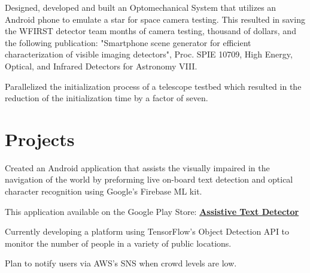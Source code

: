 \documentclass[letterpaper]{deedy-resume} %
\begin{document}
\begin{minipage}[t]{0.66\textwidth}
\sectionspace %


\begin{tightitemize}
	\item 	Designed, developed and built an Optomechanical System that utilizes an Android phone to emulate a star for space camera testing. This resulted in saving the WFIRST detector team months of camera testing, thousand of dollars, and the following publication: "Smartphone scene generator for efficient characterization of visible imaging detectors", Proc. SPIE 10709, High Energy, Optical, and Infrared Detectors for Astronomy VIII.
	
	\item Parallelized the initialization process of a telescope testbed which resulted in the reduction of the initialization time by a factor of seven.   
	
\end{tightitemize}
\sectionspace %


\section{Projects}

\begin{tightitemize}
	\item Created an Android application that assists the visually impaired in the navigation of the world by preforming live on-board text detection and optical character recognition using Google's Firebase ML kit. 
	\item This application available on the Google Play Store:  \href{https://play.google.com/store/apps/details?id=com.leo.neat.assistivetextdetection&pageId=none}{\bf Assistive Text Detector} 
\end{tightitemize}

\sectionspace %
\begin{tightitemize}
	\item Currently developing a  platform using TensorFlow's Object Detection API to monitor the number of people in a variety of public locations. 
	\item Plan to notify users via AWS's SNS when crowd levels are low. 
\end{tightitemize}


\end{minipage}
\end{document}
